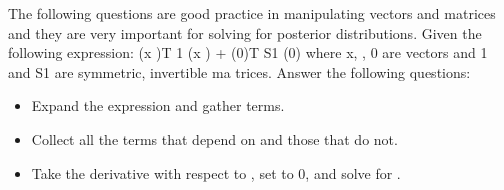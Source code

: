 \documentclass{../amsml}
\begin{document}
\begin{problem}
The following questions are good practice in manipulating vectors and matrices and they are very important for solving for posterior distributions.
Given the following expression:
(x )T 1 (x ) + (0)T S1 (0) 
where x, , 0 are vectors and 1 and S1 are symmetric, invertible ma trices.
Answer the following questions:

\begin{itemize}
	\item Expand the expression and gather terms.
	\item Collect all the terms that depend on  and those that do not.
	\item Take the derivative with respect to , set to 0, and solve for . %
\end{itemize}

\end{problem}
\end{document}
